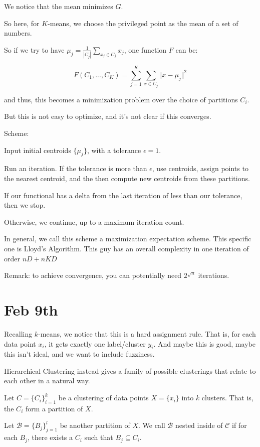 \documentclass[10pt]{article}
\begin{document}
We notice that the mean minimizes $G$. 

So here, for $K$-means, we choose the privileged point as the mean of a set of numbers.

So if we try to have $\mu_j = \frac{1}{|C_j|} \sum_{x_j \in C_j} x_j$, one function $F$ can be:

$$F(C_1,...,C_K) = \sum_{j=1}^K \sum_{x \in C_j} \Vert x - \mu_j \Vert^2$$

and thus, this becomes a minimization problem over the choice of partitions $C_i$. 

But this is not easy to optimize, and it’s not clear if this converges.

Scheme:

Input initial centroids $\{ \mu_j \}$, with a tolerance $\epsilon = 1$.

Run an iteration. If the tolerance is more than $\epsilon$, use centroids, assign points to the nearest centroid, and the then compute new centroids from these partitions. 

If our functional has a delta from the last iteration of less than our tolerance, then we stop.

Otherwise, we continue, up to a maximum iteration count.

In general, we call this scheme a maximization expectation scheme. This specific one is Lloyd’s Algorithm. This guy has an overall complexity in one iteration of order $nD + nKD$

Remark: to achieve convergence, you can potentially need $2^{\sqrt{n}}$ iterations.

\section*{Feb 9th}

Recalling $k$-means, we notice that this is a hard assignment rule. That is, for each data point $x_i$, it gets exactly one label/cluster $y_i$. And maybe this is good, maybe this isn’t ideal, and we want to include fuzziness.

Hierarchical Clustering instead gives a family of possible clusterings that relate to each other in a natural way.

Let $C = \{ C_i\}_{i=1}^k$ be a clustering of data points $X = \{ x_i \}$ into $k$ clusters. That is, the $C_i$ form a partition of $X$.

Let $\mathcal{B} = \{ B_j \}_{j=1}^l$ be another partition of $X$. We call $\mathcal{B}$ nested inside of $\mathcal{C}$ if for each $B_j$, there exists a $C_i$ such that $B_j \subseteq C_i$.  
\end{document}
